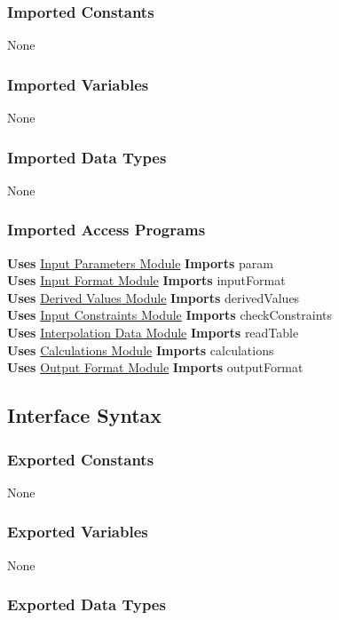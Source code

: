 \documentclass[12pt]{article}
\newcommand{\InputFormat}{\hyperref[SecInF]{Input Format Module}}
\newcommand{\InputParam}{\hyperref[SecInP]{Input Parameters Module}}
\newcommand{\InputCons}{\hyperref[SecInC]{Input Constraints Module}}
\newcommand{\DerivedVal}{\hyperref[SecDeV]{Derived Values Module}}
\newcommand{\OutputFormat}{\hyperref[SecOutF]{Output Format Module}}
\newcommand{\Calculations}{\hyperref[SecCalc]{Calculations Module}}
\newcommand{\InterpData}{\hyperref[SecInterpD]{Interpolation Data Module}}
\begin{document}
\subsubsection{Imported Constants}

None

\subsubsection{Imported Variables}

None

\subsubsection{Imported Data Types}

None

\subsubsection{Imported Access Programs}

\textbf{Uses} \InputParam{} \textbf{Imports} param \\
\textbf{Uses} \InputFormat{} \textbf{Imports} inputFormat \\
\textbf{Uses} \DerivedVal{} \textbf{Imports} derivedValues \\
\textbf{Uses} \InputCons{} \textbf{Imports} checkConstraints \\
\textbf{Uses} \InterpData{} \textbf{Imports} readTable \\
\textbf{Uses} \Calculations{} \textbf{Imports} calculations \\
\textbf{Uses} \OutputFormat{} \textbf{Imports} outputFormat

\subsection{Interface Syntax}

\subsubsection{Exported Constants}

None

\subsubsection{Exported Variables}

None

\subsubsection{Exported Data Types}
\end{document}
